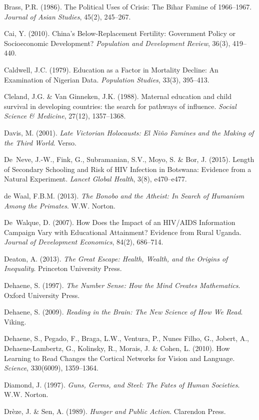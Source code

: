 \documentclass[12pt,letterpaper]{article}
\begin{document}
Brass, P.R. (1986). The Political Uses of Crisis: The Bihar Famine of
1966--1967. \emph{Journal of Asian Studies}, 45(2), 245--267.

Cai, Y. (2010). China's Below-Replacement Fertility: Government Policy
or Socioeconomic Development? \emph{Population and Development Review},
36(3), 419--440.

Caldwell, J.C. (1979). Education as a Factor in Mortality Decline:
An Examination of Nigerian Data. \emph{Population Studies}, 33(3),
395--413.

Cleland, J.G. \& Van Ginneken, J.K. (1988). Maternal education and
child survival in developing countries: the search for pathways of
influence. \emph{Social Science \& Medicine}, 27(12), 1357--1368.

Davis, M. (2001). \emph{Late Victorian Holocausts: El Niño Famines and
the Making of the Third World}. Verso.

De~Neve, J.-W., Fink, G., Subramanian, S.V., Moyo, S. \& Bor, J.
(2015). Length of Secondary Schooling and Risk of HIV Infection in
Botswana: Evidence from a Natural Experiment. \emph{Lancet Global
Health}, 3(8), e470--e477.

de Waal, F.B.M. (2013). \emph{The Bonobo and the Atheist: In Search
of Humanism Among the Primates}. W.W. Norton.

De~Walque, D. (2007). How Does the Impact of an HIV/AIDS Information
Campaign Vary with Educational Attainment? Evidence from Rural Uganda.
\emph{Journal of Development Economics}, 84(2), 686--714.

Deaton, A. (2013). \emph{The Great Escape: Health, Wealth, and the
Origins of Inequality}. Princeton University Press.

Dehaene, S. (1997). \emph{The Number Sense: How the Mind Creates
Mathematics}. Oxford University Press.

Dehaene, S. (2009). \emph{Reading in the Brain: The New Science of
How We Read}. Viking.

Dehaene, S., Pegado, F., Braga, L.W., Ventura, P., Nunes Filho, G.,
Jobert, A., Dehaene-Lambertz, G., Kolinsky, R., Morais, J. \& Cohen, L.
(2010). How Learning to Read Changes the Cortical Networks for Vision and
Language. \emph{Science}, 330(6009), 1359--1364.

Diamond, J. (1997). \emph{Guns, Germs, and Steel: The Fates of Human
Societies}. W.W. Norton.

Drèze, J. \& Sen, A. (1989). \emph{Hunger and Public Action}. Clarendon
Press.
\end{document}
